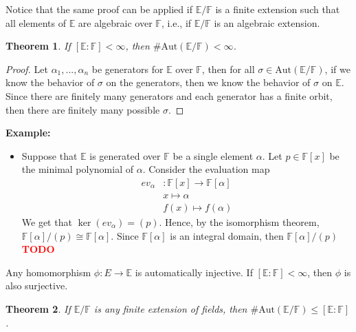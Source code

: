 \documentclass{article}
\newtheorem*{theorem}{Theorem}
\newcommand{\F}{\mathbb{F}}
\newcommand{\E}{\mathbb{E}}
\newcommand{\isomorphic}{\cong}
\newcommand{\Aut}{\text{Aut}}
\newcommand{\td}{\textcolor{red}{\textbf{TODO}}}
\newenvironment{example}{\noindent\textbf{Example:} \vspace{-0.2cm}\begin{itemize}}{\end{itemize}}
\begin{document}
Notice that the same proof can be applied if $\E / \F$ is a finite extension such that all elements of $\E$ are algebraic over $\F$, i.e., if $\E / \F$ is an algebraic extension.

\begin{theorem}
    If $[\E : \F] < \infty$, then $\#\Aut(\E / \F) < \infty$.
\end{theorem}

\begin{proof}
    Let $\alpha_1, ..., \alpha_n$ be generators for $\E$ over $\F$, then for all $\sigma \in \Aut(\E / \F)$, if we know the behavior of $\sigma$ on the generators, then we know the behavior of $\sigma$ on $\E$. Since there are finitely many generators and each generator has a finite orbit, then there are finitely many possible $\sigma$.
\end{proof}

\begin{example}
    \item Suppose that $\E$ is generated over $\F$ be a single element $\alpha$. Let $p \in \F[x]$ be the minimal polynomial of $\alpha$. Consider the evaluation map 
    \begin{align*}
        ev_{\alpha} &: \F[x] \to \F[\alpha] \\
        & x \mapsto \alpha \\
        & f(x) \mapsto f(\alpha)
    \end{align*}
    We get that $\ker(ev_{\alpha}) = (p)$. Hence, by the isomorphism theorem, $\F[\alpha]/(p) \isomorphic \F[\alpha]$. Since $\F[\alpha]$ is an integral domain, then $\F[\alpha]/(p)$ \td  
\end{example}

Any homomorphism $\phi : E \to \E$ is automatically injective. If $[\E : \F] < \infty$, then $\phi$ is also surjective.

\begin{theorem}
    If $\E/\F$ is any finite extension of fields, then $\# \Aut(\E / \F) \leq [\E : \F]$.
\end{theorem}
\end{document}
